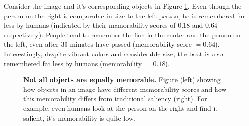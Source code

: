 Consider the image and it's corresponding objects in Figure \ref{fig:introPhoto}. Even though the person on the right is comparable in size to the left person, he is remembered far less by humans (indicated by their memorability scores of $0.18$ and $0.64$ respectively). People tend to remember the fish in the center and the person on the left, even after $30$ minutes have passed (memorability score $= 0.64$). Interestingly, despite vibrant colors and considerable size, the boat is also remembered far less by humans (memorability $= 0.18$).


\begin{figure}[t]
\centering
{}
\vspace{-5mm}\caption{\footnotesize\textbf{Not all objects are equally memorable.} Figure (left) showing how objects in an image have different memorability scores and how this memorability differs from traditional saliency (right). For example, even humans look at the person on the right and find it salient, it's memorability is quite low. }\label{fig:introPhoto}
\end{figure}

